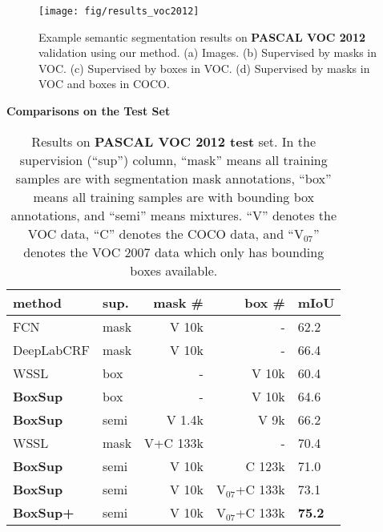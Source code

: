 \documentclass[10pt,twocolumn,letterpaper]{article}
\newcommand{\tn}[1]{\footnotesize{#1}}
\begin{document}
\begin{figure*}[t]
	\centering
	\texttt{[image: fig/results\_voc2012]}
	\caption{Example semantic segmentation results on \textbf{PASCAL VOC 2012} validation using our method. (a) Images. (b) Supervised by masks in VOC. (c) Supervised by boxes in VOC. (d) Supervised by masks in VOC and boxes in COCO.}
	\label{fig:results}
\end{figure*}

\vspace{8pt}
\noindent\textbf{Comparisons on the Test Set}

\setlength{\tabcolsep}{4pt}
\renewcommand{\arraystretch}{1.1}
\begin{table}[t]
	\begin{center}
\begin{small}
		\begin{tabular}{x|x|r|r|x}
			\hline
			method & sup. & mask \# & box \# & mIoU\\
			\hline
			\hline
			FCN  \cite{Long2015} & mask & V 10k & - & 62.2\\
			\tn{DeepLabCRF}  \cite{Chen2015} & mask & V 10k & - & 66.4\\
			WSSL \cite{papandreou2015weakly} & box & - & V 10k & 60.4\\
			\textbf{BoxSup} & box & - & V 10k  & 64.6\\
			\textbf{BoxSup} & semi & V 1.4k & V 9k & 66.2\\
			\hline
			WSSL \cite{papandreou2015weakly} & mask & V+C 133k & - & 70.4\\
			\textbf{BoxSup} & semi & V 10k  & C 123k & 71.0\\
			\textbf{BoxSup} & semi & V 10k  & V$_{07}$+C 133k & 73.1 \\
			\textbf{BoxSup+} & semi & V 10k  & V$_{07}$+C 133k & \textbf{75.2}\\
            \hline
		\end{tabular}
\end{small}
	\end{center}
	\caption{Results on \textbf{PASCAL VOC 2012 test} set. In the supervision (``sup'') column, ``mask'' means all training samples are with segmentation mask annotations, ``box'' means all training samples are with bounding box annotations, and ``semi'' means mixtures. ``V'' denotes the VOC data, ``C'' denotes the COCO data, and ``V$_{07}$'' denotes the VOC 2007 data which only has bounding boxes available.}
	\label{tab:voc2012_test}
\end{table}
\end{document}
